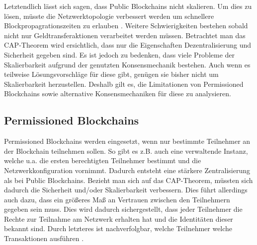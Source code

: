 Letztendlich lässt sich sagen, dass Public Blockchains nicht skalieren. Um dies zu lösen, müsste die Netzwerktopologie verbessert werden um schnellere Blockpropagrationszeiten zu erlauben \cite{SchererPerformanceScalabilityBlockchain2017}. Weitere Schwierigkeiten bestehen sobald nicht nur Geldtransferaktionen verarbeitet werden müssen. Betrachtet man das CAP-Theorem wird ersichtlich, dass nur die Eigenschaften Dezentralisierung und Sicherheit gegeben sind. Es ist jedoch zu bedenken, dass viele Probleme der Skalierbarkeit aufgrund der genutzten Konsensmechanik bestehen. Auch wenn es teilweise Lösungsvorschläge für diese gibt, genügen sie bisher nicht um Skalierbarkeit herzustellen. Deshalb gilt es, die Limitationen von Permissioned Blockchains sowie alternative Konsensmechaniken für diese zu analysieren.


\subsection{Permissioned Blockchains}
Permissioned Blockchains werden eingesetzt, wenn nur bestimmte Teilnehmer an der Blockchain teilnehmen sollen. So gibt es z.B. auch eine verwaltende Instanz, welche u.a. die ersten berechtigten Teilnehmer bestimmt und die Netzwerkkonfiguration vornimmt. Dadurch entsteht eine stärkere Zentralisierung als bei Public Blockchains. Bezieht man sich auf das CAP-Theorem, müssten sich dadurch die Sicherheit und/oder Skalierbarkeit verbessern. Dies führt allerdings auch dazu, dass ein größeres Maß an Vertrauen zwischen den Teilnehmern gegeben sein muss. Dies wird dadurch sichergestellt, dass jeder Teilnehmer die Rechte zur Teilnahme am Netzwerk erhalten hat und die Identitäten dieser bekannt sind. Durch letzteres ist nachverfolgbar, welche Teilnehmer welche Transaktionen ausführen \cite{SchererPerformanceScalabilityBlockchain2017}.

